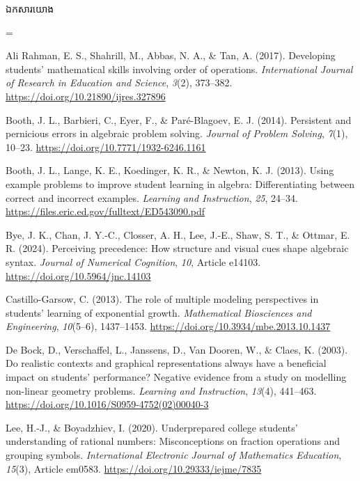 \documentclass[a4paper,12pt]{article}
\newcommand{\refbanner}[1]{%
  \Needspace{2.1cm}%
  \vspace{2pt}%
  \begin{tcolorbox}[
    enhanced, sharp corners, colback=headgray, colframe=black,
    boxrule=0.85pt, borderline south={0.6pt}{1.8pt}{black},
    top=6pt, bottom=6pt, left=9pt, right=9pt,
    before skip=3pt, after skip=4pt
  ]
    {\muol\fontsize{12pt}{19pt}\selectfont #1}%
  \end{tcolorbox}%
}
\begin{document}
\vspace{2pt}
\refbanner{ឯកសារយោង}

{\TimesEn\linespread{1.08}\selectfont\fontsize{10.8pt}{16.2pt}\selectfont
\setlength{\parskip}{6.5pt}
\everypar={\hangindent=0.85cm }

Ali Rahman, E. S., Shahrill, M., Abbas, N. A., \& Tan, A. (2017). Developing students' mathematical skills involving order of operations. \textit{International Journal of Research in Education and Science}, \textit{3}(2), 373--382. \url{https://doi.org/10.21890/ijres.327896}

Booth, J. L., Barbieri, C., Eyer, F., \& Paré-Blagoev, E. J. (2014). Persistent and pernicious errors in algebraic problem solving. \textit{Journal of Problem Solving}, \textit{7}(1), 10--23. \url{https://doi.org/10.7771/1932-6246.1161}

Booth, J. L., Lange, K. E., Koedinger, K. R., \& Newton, K. J. (2013). Using example problems to improve student learning in algebra: Differentiating between correct and incorrect examples. \textit{Learning and Instruction}, \textit{25}, 24--34. \url{https://files.eric.ed.gov/fulltext/ED543090.pdf}

Bye, J. K., Chan, J. Y.-C., Closser, A. H., Lee, J.-E., Shaw, S. T., \& Ottmar, E. R. (2024). Perceiving precedence: How structure and visual cues shape algebraic syntax. \textit{Journal of Numerical Cognition}, \textit{10}, Article e14103. \url{https://doi.org/10.5964/jnc.14103}

Castillo-Garsow, C. (2013). The role of multiple modeling perspectives in students' learning of exponential growth. \textit{Mathematical Biosciences and Engineering}, \textit{10}(5--6), 1437--1453. \url{https://doi.org/10.3934/mbe.2013.10.1437}

De Bock, D., Verschaffel, L., Janssens, D., Van Dooren, W., \& Claes, K. (2003). Do realistic contexts and graphical representations always have a beneficial impact on students' performance? Negative evidence from a study on modelling non-linear geometry problems. \textit{Learning and Instruction}, \textit{13}(4), 441--463. \url{https://doi.org/10.1016/S0959-4752(02)00040-3}

Lee, H.-J., \& Boyadzhiev, I. (2020). Underprepared college students' understanding of rational numbers: Misconceptions on fraction operations and grouping symbols. \textit{International Electronic Journal of Mathematics Education}, \textit{15}(3), Article em0583. \url{https://doi.org/10.29333/iejme/7835}

}
\end{document}
